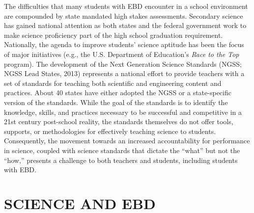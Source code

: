 \documentclass[11.5pt]{sig-alternate} %
\begin{document}
\begin{large}
The difficulties that many students with EBD encounter in a school environment are compounded by state mandated high stakes assessments. Secondary science has gained national attention as both states and the federal government work to make science proficiency part of the high school graduation requirement. Nationally, the agenda to improve students’ science aptitude has been the focus of major initiatives (e.g., the U.S. Department of Education’s \textit{Race to the Top} program). The development of the Next Generation Science Standards (NGSS; NGSS Lead States, 2013) represents a national effort to provide teachers with a set of standards for teaching both scientific and engineering content and practices. About 40 states have either adopted the NGSS or a state-specific version of the standards. While the goal of the standards is to identify the knowledge, skills, and practices necessary to be successful and competitive in a 21st century post-school reality, the standards themselves do not offer tools, supports, or methodologies for effectively teaching science to students. Consequently, the movement towards an increased accountability for performance in science, coupled with science standards that dictate the “what” but not the “how,” presents a challenge to both teachers and students, including students with EBD.

\section*{SCIENCE AND EBD}


\end{large}
\end{document}
